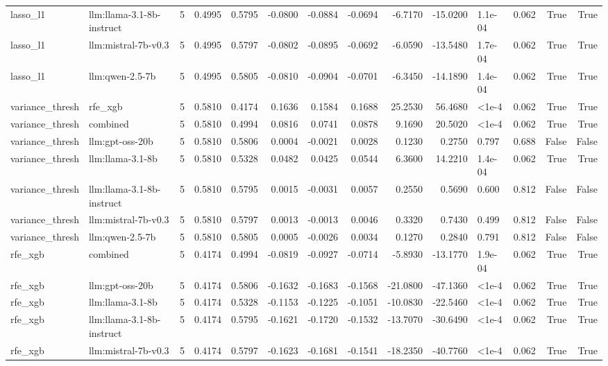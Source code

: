 \begin{tabular}{llrrrrrrrrllrr}
lasso_l1 & llm:llama-3.1-8b-instruct & 5 & 0.4995 & 0.5795 & -0.0800 & -0.0884 & -0.0694 & -6.7170 & -15.0200 & 1.1e-04 & 0.062 & True & True \\
lasso_l1 & llm:mistral-7b-v0.3 & 5 & 0.4995 & 0.5797 & -0.0802 & -0.0895 & -0.0692 & -6.0590 & -13.5480 & 1.7e-04 & 0.062 & True & True \\
lasso_l1 & llm:qwen-2.5-7b & 5 & 0.4995 & 0.5805 & -0.0810 & -0.0904 & -0.0701 & -6.3450 & -14.1890 & 1.4e-04 & 0.062 & True & True \\
variance_thresh & rfe_xgb & 5 & 0.5810 & 0.4174 & 0.1636 & 0.1584 & 0.1688 & 25.2530 & 56.4680 & <1e-4 & 0.062 & True & True \\
variance_thresh & combined & 5 & 0.5810 & 0.4994 & 0.0816 & 0.0741 & 0.0878 & 9.1690 & 20.5020 & <1e-4 & 0.062 & True & True \\
variance_thresh & llm:gpt-oss-20b & 5 & 0.5810 & 0.5806 & 0.0004 & -0.0021 & 0.0028 & 0.1230 & 0.2750 & 0.797 & 0.688 & False & False \\
variance_thresh & llm:llama-3.1-8b & 5 & 0.5810 & 0.5328 & 0.0482 & 0.0425 & 0.0544 & 6.3600 & 14.2210 & 1.4e-04 & 0.062 & True & True \\
variance_thresh & llm:llama-3.1-8b-instruct & 5 & 0.5810 & 0.5795 & 0.0015 & -0.0031 & 0.0057 & 0.2550 & 0.5690 & 0.600 & 0.812 & False & False \\
variance_thresh & llm:mistral-7b-v0.3 & 5 & 0.5810 & 0.5797 & 0.0013 & -0.0013 & 0.0046 & 0.3320 & 0.7430 & 0.499 & 0.812 & False & False \\
variance_thresh & llm:qwen-2.5-7b & 5 & 0.5810 & 0.5805 & 0.0005 & -0.0026 & 0.0034 & 0.1270 & 0.2840 & 0.791 & 0.812 & False & False \\
rfe_xgb & combined & 5 & 0.4174 & 0.4994 & -0.0819 & -0.0927 & -0.0714 & -5.8930 & -13.1770 & 1.9e-04 & 0.062 & True & True \\
rfe_xgb & llm:gpt-oss-20b & 5 & 0.4174 & 0.5806 & -0.1632 & -0.1683 & -0.1568 & -21.0800 & -47.1360 & <1e-4 & 0.062 & True & True \\
rfe_xgb & llm:llama-3.1-8b & 5 & 0.4174 & 0.5328 & -0.1153 & -0.1225 & -0.1051 & -10.0830 & -22.5460 & <1e-4 & 0.062 & True & True \\
rfe_xgb & llm:llama-3.1-8b-instruct & 5 & 0.4174 & 0.5795 & -0.1621 & -0.1720 & -0.1532 & -13.7070 & -30.6490 & <1e-4 & 0.062 & True & True \\
rfe_xgb & llm:mistral-7b-v0.3 & 5 & 0.4174 & 0.5797 & -0.1623 & -0.1681 & -0.1541 & -18.2350 & -40.7760 & <1e-4 & 0.062 & True & True \\

\end{tabular}
